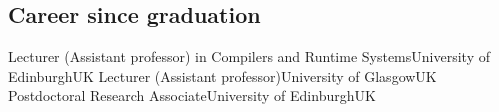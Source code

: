 \subsection{Career since graduation}
\vspace{-1.75em}
        {Lecturer ({\small Assistant professor}) in Compilers and Runtime Systems}{\newline University of Edinburgh}{UK}{}{}
        {Lecturer ({\small Assistant professor})}{University of Glasgow}{UK}{}{}
        {Postdoctoral Research Associate}{University of Edinburgh}{UK}{}{}
